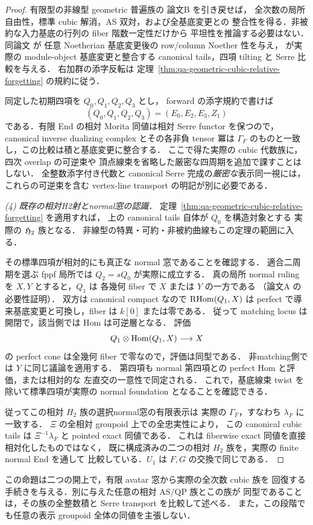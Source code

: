 \begin{proof}
有限型の非線型 geometric 普遍族の
論文B \cite[\texttt{lem:universal-flatness}]{QuadricModuli2026} を引き戻せば，
全次数の局所自由性，標準 cubic 解消，AS 双対，および全基底変更との
整合性を得る．非被約な入力基底の行列の fiber 階数一定性だけから
平坦性を推論する必要はない．
同論文 \cite[\texttt{thm:relative-geometric-cubic-noetherian}]{QuadricModuli2026} が
任意 Noetherian 基底変更後の row/column Noether 性を与え，
\cite[\texttt{prop:general-cubic-canonical-tails}]{QuadricModuli2026} が実際の module-object
基底変更と整合する canonical tails，四項 tilting と Serre 比較を与える．
右加群の添字反転は
定理~\ref{thm:qa-geometric-cubic-relative-forgetting} の規約に従う．

同定した初期四項を $Q_0,Q_1,Q_2,Q_3$ とし，
forward の添字規約で書けば
\[
 (Q_0,Q_1,Q_2,Q_3)=(E_0,E_2,E_3,Z_1)
\]
である．有限 End の相対 Morita 同値は相対 Serre functor を保つので，
canonical inverse dualizing complex とその各非負 tensor 冪は
$\Gamma_F$ のものと一致し，この比較は積と基底変更に整合する．
ここで得た実際の cubic 代数族に，四次 overlap の可逆束や
頂点線束を省略した厳密な四周期を追加で課すことはしない．
全整数添字付き代数と canonical Serre 完成の\emph{厳密な}表示同一視には，
これらの可逆束を含む vertex-line transport の明記が別に必要である．

\emph{(4) 既存の相対H2射とnormal窓の認識．}
定理~\ref{thm:qa-geometric-cubic-relative-forgetting} を適用すれば，
上の canonical tails 自体が $Q_0$ を構造対象とする
実際の $\mathfrak H_2$ 族となる．
非線型の特異・可約・非被約曲線もこの定理の範囲に入る．

その標準四項が相対的にも真正な normal 窓であることを確認する．
適合二周期を選ぶ fppf 局所では $Q_2=sQ_0$ が実際に成立する．
真の局所 normal ruling を $X,Y$ とすると，$Q_1$ は
各幾何 fiber で $X$ または $Y$ の一方である
（論文A \cite[\texttt{thm:cubic-coverage}]{QuadricIntrinsic2026} の必要性証明）．
双方は canonical compact なので $\operatorname{RHom}(Q_1,X)$ は
perfect で導来基底変更と可換し，fiber は $k[0]$ または零である．
従って matching locus は開閉で，該当側では Hom は可逆層となる．
評価
\[
 Q_1\otimes\operatorname{Hom}(Q_1,X)\longrightarrow X
\]
の perfect cone は全幾何 fiber で零なので，評価は同型である．
非matching側では $Y$ に同じ議論を適用する．
第四項も normal 第四項との perfect Hom と評価，または相対的な
左直交の一意性で同定される．
これで，基底線束 twist を除いて標準四項が実際の normal foundation
となることを確認できる．

従ってこの相対 $H_2$ 族の選択normal窓の有限表示は
実際の $\Gamma_F$，すなわち $\lambda_F$ に一致する．
$\Xi$ の全相対 groupoid 上での全忠実性により，
この canonical cubic tails は $\Xi^{-1}\lambda_F$ と
pointed exact 同値である．
これは fiberwise exact 同値を直接相対化したものではなく，
既に構成済みの二つの相対 $H_2$ 族を，実際の finite normal End を通して
比較している．$U_1$ は $F,G$ の交換で同じである．
\end{proof}

\begin{remark}[用途と範囲]
この命題は二つの開上で，有限 avatar 窓から実際の全次数 cubic 族を
回復する手続きを与える．別に与えた任意の相対 AS/QP 族とこの族が
同型であることは，その族の全整数積と Serre transport を比較して述べる．
また，この段階でも任意の表示 groupoid 全体の同値を主張しない．
\end{remark}
